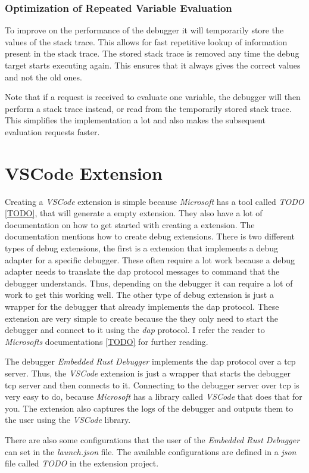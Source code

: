 \subsubsection{Optimization of Repeated Variable Evaluation}
To improve on the performance of the debugger it will temporarily store the values of the stack trace.
This allows for fast repetitive lookup of information present in the stack trace.
The stored stack trace is removed any time the debug target starts executing again.
This ensures that it always gives the correct values and not the old ones.


Note that if a request is received to evaluate one variable, the debugger will then perform a stack trace instead, or read from the temporarily stored stack trace.
This simplifies the implementation a lot and also makes the subsequent evaluation requests faster.


\section{VSCode Extension}
Creating a \emph{VSCode} extension is simple because \emph{Microsoft} has a tool called \emph{TODO} \ref{TODO}, that will generate a empty extension.
They also have a lot of documentation on how to get started with creating a extension.
The documentation mentions how to create debug extensions.
There is two different types of debug extensions, the first is a extension that implements a debug adapter for a specific debugger.
These often require a lot work because a debug adapter needs to translate the \gls{dap} protocol messages to command that the debugger understands.
Thus, depending on the debugger it can require a lot of work to get this working well.
The other type of debug extension is just a wrapper for the debugger that already implements the \gls{dap} protocol.
These extension are very simple to create because the they only need to start the debugger and connect to it using the \emph{dap} protocol.
I refer the reader to \emph{Microsofts} documentations \ref{TODO} for further reading.

The debugger \emph{Embedded Rust Debugger} implements the \gls{dap} protocol over a \gls{tcp} server.
Thus, the \emph{VSCode} extension is just a wrapper that starts the debugger \gls{tcp} server and then connects to it.
Connecting to the debugger server over \gls{tcp} is very easy to do, because \emph{Microsoft} has a library called \emph{VSCode} that does that for you.
The extension also captures the logs of the debugger and outputs them to the user using the \emph{VSCode} library.

There are also some configurations that the user of the \emph{Embedded Rust Debugger} can set in the \emph{launch.json} file.
The available configurations are defined in a \emph{json} file called \emph{TODO} in the extension project.
